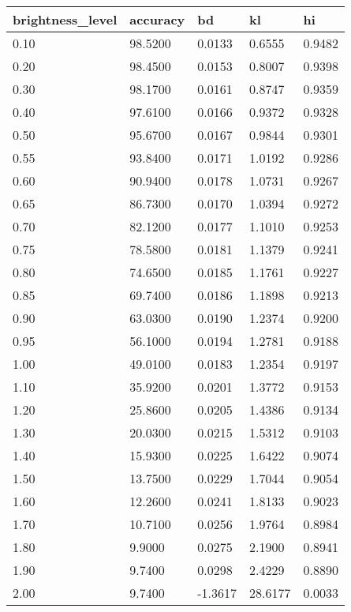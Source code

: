 \begin{tabular}{lllll}
\toprule
brightness_level & accuracy & bd & kl & hi \\
\midrule
0.10 & 98.5200 & 0.0133 & 0.6555 & 0.9482 \\
0.20 & 98.4500 & 0.0153 & 0.8007 & 0.9398 \\
0.30 & 98.1700 & 0.0161 & 0.8747 & 0.9359 \\
0.40 & 97.6100 & 0.0166 & 0.9372 & 0.9328 \\
0.50 & 95.6700 & 0.0167 & 0.9844 & 0.9301 \\
0.55 & 93.8400 & 0.0171 & 1.0192 & 0.9286 \\
0.60 & 90.9400 & 0.0178 & 1.0731 & 0.9267 \\
0.65 & 86.7300 & 0.0170 & 1.0394 & 0.9272 \\
0.70 & 82.1200 & 0.0177 & 1.1010 & 0.9253 \\
0.75 & 78.5800 & 0.0181 & 1.1379 & 0.9241 \\
0.80 & 74.6500 & 0.0185 & 1.1761 & 0.9227 \\
0.85 & 69.7400 & 0.0186 & 1.1898 & 0.9213 \\
0.90 & 63.0300 & 0.0190 & 1.2374 & 0.9200 \\
0.95 & 56.1000 & 0.0194 & 1.2781 & 0.9188 \\
1.00 & 49.0100 & 0.0183 & 1.2354 & 0.9197 \\
1.10 & 35.9200 & 0.0201 & 1.3772 & 0.9153 \\
1.20 & 25.8600 & 0.0205 & 1.4386 & 0.9134 \\
1.30 & 20.0300 & 0.0215 & 1.5312 & 0.9103 \\
1.40 & 15.9300 & 0.0225 & 1.6422 & 0.9074 \\
1.50 & 13.7500 & 0.0229 & 1.7044 & 0.9054 \\
1.60 & 12.2600 & 0.0241 & 1.8133 & 0.9023 \\
1.70 & 10.7100 & 0.0256 & 1.9764 & 0.8984 \\
1.80 & 9.9000 & 0.0275 & 2.1900 & 0.8941 \\
1.90 & 9.7400 & 0.0298 & 2.4229 & 0.8890 \\
2.00 & 9.7400 & -1.3617 & 28.6177 & 0.0033 \\
\bottomrule
\end{tabular}
